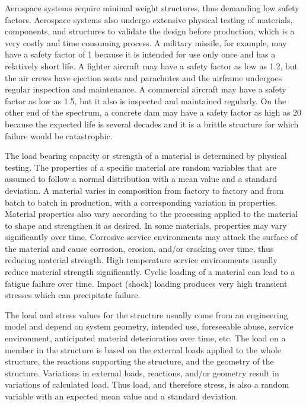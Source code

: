 Aerospace systems require minimal weight structures, thus demanding low safety factors. Aerospace systems also undergo extensive physical testing of materials, components, and structures to validate the design before production, which is a very costly and time consuming process. A military missile, for example, may have a safety factor of 1 because it is intended for use only once and has a relatively short life. A fighter aircraft may have a safety factor as low as 1.2, but the air crews have ejection seats and parachutes and the airframe undergoes regular inspection and maintenance. A commercial aircraft may have a safety factor as low as 1.5, but it also is inspected and maintained regularly. On the other end of the spectrum, a concrete dam may have a safety factor as high as 20 because the expected life is several decades and it is a brittle structure for which failure would be catastrophic.

The load bearing capacity or strength of a material is determined by physical testing. The properties of a specific material are random variables that are assumed to follow a normal distribution with a mean value and a standard deviation. A material varies in composition from factory to factory and from batch to batch in production, with a corresponding variation in properties. Material properties also vary according to the processing applied to the material to shape and strengthen it as desired. In some materials, properties may vary significantly over time. Corrosive service environments may attack the surface of the material and cause corrosion, erosion, and/or cracking over time, thus reducing material strength. High temperature service environments usually reduce material strength significantly. Cyclic loading of a material can lead to a fatigue failure over time. Impact (shock) loading produces very high transient stresses which can precipitate failure.

The load and stress values for the structure usually come from an engineering model and depend on system geometry, intended use, foreseeable abuse, service environment, anticipated material deterioration over time, etc. The load on a member in the structure is based on the external loads applied to the whole structure, the reactions supporting the structure, and the geometry of the structure. Variations in external loads, reactions, and/or geometry result in variations of calculated load. Thus load, and therefore stress, is also a random variable with an expected mean value and a standard deviation.

